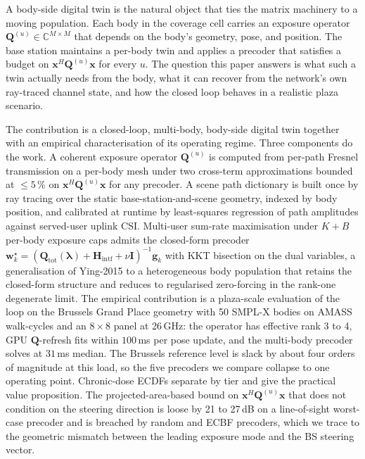 \documentclass[journal,twocolumn,10pt]{IEEEtran}
\theoremstyle{plain}
\theoremstyle{remark}
\newcommand{\xx}{\mathbf{x}}
\newcommand{\ww}{\mathbf{w}}
\newcommand{\gvec}{\mathbf{g}}
\newcommand{\Qmat}{\mathbf{Q}}
\newcommand{\Hintf}{\mathbf{H}_{\mathrm{intf}}}
\newcommand{\Complex}{\mathbb{C}}
\begin{document}
A body-side digital twin is the natural object that ties the matrix
machinery to a moving population. Each body in the coverage cell
carries an exposure operator $\Qmat^{(u)} \in \Complex^{M \times M}$
that depends on the body's geometry, pose, and position. The base
station maintains a per-body twin and applies a precoder that
satisfies a budget on $\xx^H \Qmat^{(u)} \xx$ for every $u$. The
question this paper answers is what such a twin actually needs from
the body, what it can recover from the network's own ray-traced
channel state, and how the closed loop behaves in a realistic plaza
scenario.

The contribution is a closed-loop, multi-body, body-side digital twin
together with an empirical characterisation of its operating regime.
Three components do the work. A coherent exposure operator $\Qmat^{(u)}$
is computed from per-path Fresnel transmission on a per-body mesh
under two cross-term approximations bounded at $\leq 5\,\%$ on
$\xx^H \Qmat^{(u)} \xx$ for any precoder. A scene path dictionary is
built once by ray tracing over the static base-station-and-scene
geometry, indexed by body position, and calibrated at runtime by
least-squares regression of path amplitudes against served-user
uplink CSI. Multi-user sum-rate maximisation under $K + B$ per-body
exposure caps admits the closed-form precoder
$\ww_k^\star = (\Qmat_{\mathrm{tot}}(\bm\lambda) + \Hintf +
\nu \mathbf{I})^{-1} \gvec_k$ with KKT bisection on the dual variables,
a generalisation of
Ying-2015 to a heterogeneous body population that retains the
closed-form structure and reduces to regularised zero-forcing in the
rank-one degenerate limit. The empirical contribution is a
plaza-scale evaluation of the loop on the Brussels Grand Place
geometry with 50 SMPL-X bodies on AMASS walk-cycles and an
$8 \times 8$ panel at 26\,GHz: the operator has effective rank 3 to 4,
GPU $\Qmat$-refresh fits within $100\,$ms per pose update, and the
multi-body precoder solves at $31\,$ms median. The Brussels reference
level is slack by about four orders of magnitude at this load, so the
five precoders we compare collapse to one operating point. Chronic-dose
ECDFs separate by tier and give the practical value proposition. The
projected-area-based bound on $\xx^H \Qmat^{(u)} \xx$ that does not
condition on the steering direction is loose by 21 to 27\,dB on a
line-of-sight worst-case precoder and is breached by random and ECBF
precoders, which we trace to the geometric mismatch between the
leading exposure mode and the BS steering vector.
\end{document}
